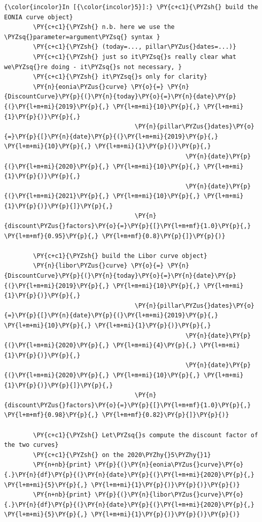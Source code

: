     \begin{Verbatim}[commandchars=\\\{\}]
{\color{incolor}In [{\color{incolor}5}]:} \PY{c+c1}{\PYZsh{} build the EONIA curve object}
        \PY{c+c1}{\PYZsh{} n.b. here we use the \PYZsq{}parameter=argument\PYZsq{} syntax }
        \PY{c+c1}{\PYZsh{} (today=..., pillar\PYZus{}dates=...)}
        \PY{c+c1}{\PYZsh{} just so it\PYZsq{}s really clear what we\PYZsq{}re doing - it\PYZsq{}s not necessary, }
        \PY{c+c1}{\PYZsh{} it\PYZsq{}s only for clarity}
        \PY{n}{eonia\PYZus{}curve} \PY{o}{=} \PY{n}{DiscountCurve}\PY{p}{(}\PY{n}{today}\PY{o}{=}\PY{n}{date}\PY{p}{(}\PY{l+m+mi}{2019}\PY{p}{,} \PY{l+m+mi}{10}\PY{p}{,} \PY{l+m+mi}{1}\PY{p}{)}\PY{p}{,}
                                    \PY{n}{pillar\PYZus{}dates}\PY{o}{=}\PY{p}{[}\PY{n}{date}\PY{p}{(}\PY{l+m+mi}{2019}\PY{p}{,} \PY{l+m+mi}{10}\PY{p}{,} \PY{l+m+mi}{1}\PY{p}{)}\PY{p}{,} 
                                                  \PY{n}{date}\PY{p}{(}\PY{l+m+mi}{2020}\PY{p}{,} \PY{l+m+mi}{10}\PY{p}{,} \PY{l+m+mi}{1}\PY{p}{)}\PY{p}{,} 
                                                  \PY{n}{date}\PY{p}{(}\PY{l+m+mi}{2021}\PY{p}{,} \PY{l+m+mi}{10}\PY{p}{,} \PY{l+m+mi}{1}\PY{p}{)}\PY{p}{]}\PY{p}{,}
                                    \PY{n}{discount\PYZus{}factors}\PY{o}{=}\PY{p}{[}\PY{l+m+mf}{1.0}\PY{p}{,} \PY{l+m+mf}{0.95}\PY{p}{,} \PY{l+m+mf}{0.8}\PY{p}{]}\PY{p}{)}
        
        \PY{c+c1}{\PYZsh{} build the Libor curve object}
        \PY{n}{libor\PYZus{}curve} \PY{o}{=} \PY{n}{DiscountCurve}\PY{p}{(}\PY{n}{today}\PY{o}{=}\PY{n}{date}\PY{p}{(}\PY{l+m+mi}{2019}\PY{p}{,} \PY{l+m+mi}{10}\PY{p}{,} \PY{l+m+mi}{1}\PY{p}{)}\PY{p}{,}
                                    \PY{n}{pillar\PYZus{}dates}\PY{o}{=}\PY{p}{[}\PY{n}{date}\PY{p}{(}\PY{l+m+mi}{2019}\PY{p}{,} \PY{l+m+mi}{10}\PY{p}{,} \PY{l+m+mi}{1}\PY{p}{)}\PY{p}{,} 
                                                  \PY{n}{date}\PY{p}{(}\PY{l+m+mi}{2020}\PY{p}{,} \PY{l+m+mi}{4}\PY{p}{,} \PY{l+m+mi}{1}\PY{p}{)}\PY{p}{,} 
                                                  \PY{n}{date}\PY{p}{(}\PY{l+m+mi}{2020}\PY{p}{,} \PY{l+m+mi}{10}\PY{p}{,} \PY{l+m+mi}{1}\PY{p}{)}\PY{p}{]}\PY{p}{,}
                                    \PY{n}{discount\PYZus{}factors}\PY{o}{=}\PY{p}{[}\PY{l+m+mf}{1.0}\PY{p}{,} \PY{l+m+mf}{0.98}\PY{p}{,} \PY{l+m+mf}{0.82}\PY{p}{]}\PY{p}{)}
        
        \PY{c+c1}{\PYZsh{} Let\PYZsq{}s compute the discount factor of the two curves}
        \PY{c+c1}{\PYZsh{} on the 2020\PYZhy{}5\PYZhy{}1}
        \PY{n+nb}{print} \PY{p}{(}\PY{n}{eonia\PYZus{}curve}\PY{o}{.}\PY{n}{df}\PY{p}{(}\PY{n}{date}\PY{p}{(}\PY{l+m+mi}{2020}\PY{p}{,} \PY{l+m+mi}{5}\PY{p}{,} \PY{l+m+mi}{1}\PY{p}{)}\PY{p}{)}\PY{p}{)}
        \PY{n+nb}{print} \PY{p}{(}\PY{n}{libor\PYZus{}curve}\PY{o}{.}\PY{n}{df}\PY{p}{(}\PY{n}{date}\PY{p}{(}\PY{l+m+mi}{2020}\PY{p}{,} \PY{l+m+mi}{5}\PY{p}{,} \PY{l+m+mi}{1}\PY{p}{)}\PY{p}{)}\PY{p}{)}
\end{Verbatim}

